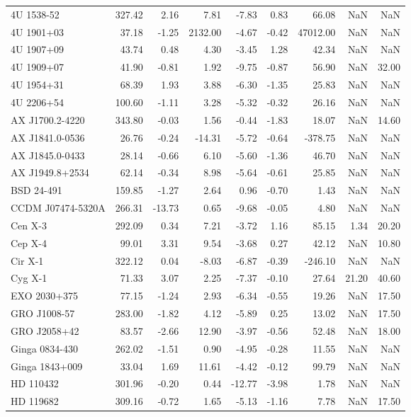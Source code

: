 \documentclass{article}%
\begin{document}
\begin{longtable}{lrrrrrrrr}
4U 1538-52 & 327.42 & 2.16 & 7.81 & -7.83 & 0.83 & 66.08 & NaN & NaN \\
4U 1901+03 & 37.18 & -1.25 & 2132.00 & -4.67 & -0.42 & 47012.00 & NaN & NaN \\
4U 1907+09 & 43.74 & 0.48 & 4.30 & -3.45 & 1.28 & 42.34 & NaN & NaN \\
4U 1909+07 & 41.90 & -0.81 & 1.92 & -9.75 & -0.87 & 56.90 & NaN & 32.00 \\
4U 1954+31 & 68.39 & 1.93 & 3.88 & -6.30 & -1.35 & 25.83 & NaN & NaN \\
4U 2206+54 & 100.60 & -1.11 & 3.28 & -5.32 & -0.32 & 26.16 & NaN & NaN \\
AX J1700.2-4220 & 343.80 & -0.03 & 1.56 & -0.44 & -1.83 & 18.07 & NaN & 14.60 \\
AX J1841.0-0536 & 26.76 & -0.24 & -14.31 & -5.72 & -0.64 & -378.75 & NaN & NaN \\
AX J1845.0-0433 & 28.14 & -0.66 & 6.10 & -5.60 & -1.36 & 46.70 & NaN & NaN \\
AX J1949.8+2534 & 62.14 & -0.34 & 8.98 & -5.64 & -0.61 & 25.85 & NaN & NaN \\
BSD 24-491 & 159.85 & -1.27 & 2.64 & 0.96 & -0.70 & 1.43 & NaN & NaN \\
CCDM J07474-5320A & 266.31 & -13.73 & 0.65 & -9.68 & -0.05 & 4.80 & NaN & NaN \\
Cen X-3 & 292.09 & 0.34 & 7.21 & -3.72 & 1.16 & 85.15 & 1.34 & 20.20 \\
Cep X-4 & 99.01 & 3.31 & 9.54 & -3.68 & 0.27 & 42.12 & NaN & 10.80 \\
Cir X-1 & 322.12 & 0.04 & -8.03 & -6.87 & -0.39 & -246.10 & NaN & NaN \\
Cyg X-1 & 71.33 & 3.07 & 2.25 & -7.37 & -0.10 & 27.64 & 21.20 & 40.60 \\
EXO 2030+375 & 77.15 & -1.24 & 2.93 & -6.34 & -0.55 & 19.26 & NaN & 17.50 \\
GRO J1008-57 & 283.00 & -1.82 & 4.12 & -5.89 & 0.25 & 13.02 & NaN & 17.50 \\
GRO J2058+42 & 83.57 & -2.66 & 12.90 & -3.97 & -0.56 & 52.48 & NaN & 18.00 \\
Ginga 0834-430 & 262.02 & -1.51 & 0.90 & -4.95 & -0.28 & 11.55 & NaN & NaN \\
Ginga 1843+009 & 33.04 & 1.69 & 11.61 & -4.42 & -0.12 & 99.79 & NaN & NaN \\
HD 110432 & 301.96 & -0.20 & 0.44 & -12.77 & -3.98 & 1.78 & NaN & NaN \\
HD 119682 & 309.16 & -0.72 & 1.65 & -5.13 & -1.16 & 7.78 & NaN & 17.50 \\

\end{longtable}
\end{document}
